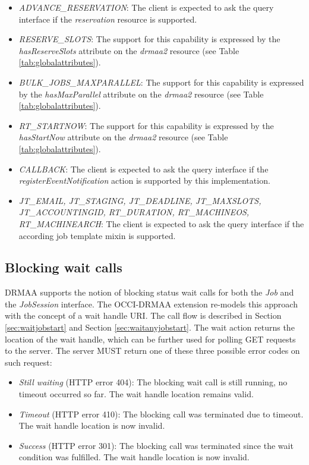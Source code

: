 \documentclass[10pt]{article}
\begin{document}
\begin{itemize}
\item \emph{ADVANCE\_RESERVATION}: The client is expected to ask the query interface if the \emph{reservation} resource is supported. 
\item \emph{RESERVE\_SLOTS}: The support for this capability is expressed by the \emph{hasReserveSlots} attribute on the \emph{drmaa2} resource (see Table \ref{tab:globalattributes}).
\item \emph{BULK\_JOBS\_MAXPARALLEL}: The support for this capability is expressed by the \emph{hasMaxParallel} attribute on the \emph{drmaa2} resource (see Table \ref{tab:globalattributes}).
\item \emph{RT\_STARTNOW}: The support for this capability is expressed by the \emph{hasStartNow} attribute on the \emph{drmaa2} resource (see Table \ref{tab:globalattributes}). 
\item \emph{CALLBACK}: The client is expected to ask the query interface if the \emph{registerEventNotification} action is supported by this implementation. 
\item \emph{JT\_EMAIL, JT\_STAGING, JT\_DEADLINE, JT\_MAXSLOTS, JT\_ACCOUNTINGID, RT\_DURATION, RT\_MACHINEOS, RT\_MACHINEARCH}: The client is expected to ask the query interface if the according job template mixin is supported. 
\end{itemize}

\subsection{Blocking wait calls}

DRMAA supports the notion of blocking status wait calls for both the \emph{Job} and the \emph{JobSession} interface. The OCCI-DRMAA extension re-models this approach with the concept of a wait handle URI. The call flow is described in Section \ref{sec:waitjobstart} and Section \ref{sec:waitanyjobstart}. The wait action returns the location of the wait handle, which can be further used for polling GET requests to the server. The server MUST return one of these three possible error codes on such request:

\begin{itemize}
\item \emph{Still waiting} (HTTP error 404): The blocking wait call is still running, no timeout occurred so far. The wait handle location remains valid.
\item \emph{Timeout} (HTTP error 410): The blocking call was terminated due to timeout. The wait handle location is now invalid.
\item \emph{Success} (HTTP error 301): The blocking call was terminated since the wait condition was fulfilled. The wait handle location is now invalid.
\end{itemize}
\end{document}
